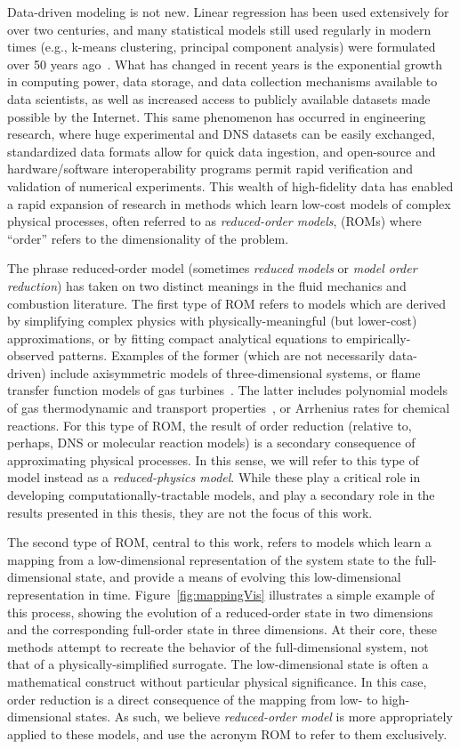 Data-driven modeling is not new. Linear regression has been used extensively for over two centuries, and many statistical models still used regularly in modern times (e.g., k-means clustering, principal component analysis) were formulated over 50 years ago~\cite{dataScience}. What has changed in recent years is the exponential growth in computing power, data storage, and data collection mechanisms available to data scientists, as well as increased access to publicly available datasets made possible by the Internet. This same phenomenon has occurred in engineering research, where huge experimental and DNS datasets can be easily exchanged, standardized data formats allow for quick data ingestion, and open-source and hardware/software interoperability programs permit rapid verification and validation of numerical experiments. This wealth of high-fidelity data has enabled a rapid expansion of research in methods which learn low-cost models of complex physical processes, often referred to as \textit{reduced-order models}, (ROMs) where ``order'' refers to the dimensionality of the problem.

The phrase reduced-order model (sometimes \textit{reduced models} or \textit{model order reduction}) has taken on two distinct meanings in the fluid mechanics and combustion literature. The first type of ROM refers to models which are derived by simplifying complex physics with physically-meaningful (but lower-cost) approximations, or by fitting compact analytical equations to empirically-observed patterns. Examples of the former (which are not necessarily data-driven) include axisymmetric models of three-dimensional systems, or flame transfer function models of gas turbines~\cite{Schuller2002}. The latter includes polynomial models of gas thermodynamic and transport properties~\cite{McBride1993}, or Arrhenius rates for chemical reactions. For this type of ROM, the result of order reduction (relative to, perhaps, DNS or molecular reaction models) is a secondary consequence of approximating physical processes. In this sense, we will refer to this type of model instead as a \textit{reduced-physics model}. While these play a critical role in developing computationally-tractable models, and play a secondary role in the results presented in this thesis, they are not the focus of this work.

The second type of ROM, central to this work, refers to models which learn a mapping from a low-dimensional representation of the system state to the full-dimensional state, and provide a means of evolving this low-dimensional representation in time. Figure~\ref{fig:mappingVis} illustrates a simple example of this process, showing the evolution of a reduced-order state in two dimensions and the corresponding full-order state in three dimensions. At their core, these methods attempt to recreate the behavior of the full-dimensional system, not that of a physically-simplified surrogate. The low-dimensional state is often a mathematical construct without particular physical significance. In this case, order reduction is a direct consequence of the mapping from low- to high-dimensional states. As such, we believe \textit{reduced-order model} is more appropriately applied to these models, and use the acronym ROM to refer to them exclusively.

